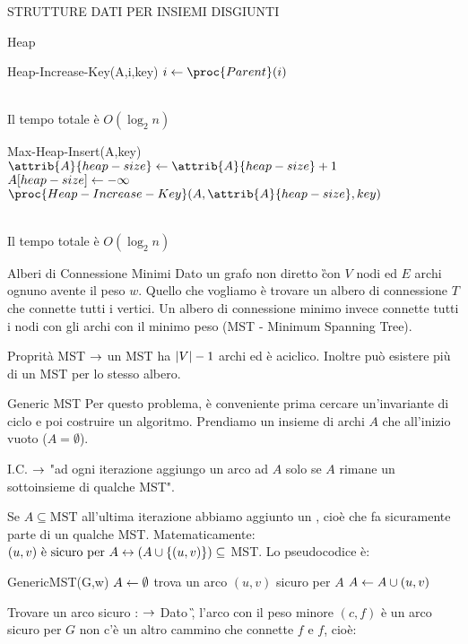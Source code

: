 \documentclass[8pt]{extarticle}
\begin{document}
\begin{formulario}
\begin{myParagraph}{STRUTTURE DATI PER INSIEMI DISGIUNTI}
\begin{subParagraph}{Heap}
\begin{code}{Heap-Increase-Key(A,i,key)}
	\li $i\get \proc{Parent}(i)$
\END
				\end{code}
\\
Il tempo totale è $O(\log_2 n)$\\
				\begin{code}{Max-Heap-Insert(A,key)}
\li $\attrib{A}{heap-size}\get \attrib{A}{heap-size}+1$
\li $A[heap-size]\leftarrow -\infty$
\li $\proc{Heap-Increase-Key}(A,\attrib{A}{heap-size},key)$
				\end{code}
\\
Il tempo totale è $O(\log_2 n)$\\
			\end{subParagraph}
	\end{myParagraph}
	
	\begin{myParagraphEnd}{Alberi di Connessione Minimi}
Dato un grafo non diretto \G con $V$ nodi ed $E$ archi ognuno avente il peso $w$. Quello che vogliamo è trovare un albero di connessione $T$ che connette tutti i vertici. Un albero di connessione minimo invece connette tutti i nodi con gli archi con il minimo peso (MST - Minimum Spanning Tree).
		\begin{Descr} 
			\item[Proprità MST] $\rightarrow$ un MST ha $\left\vert V \right\vert-1$ archi ed è aciclico. Inoltre può esistere più di un MST per lo stesso albero.
		\end{Descr}
		\begin{subParagraph}{Generic MST}
Per questo problema, è conveniente prima cercare un'invariante di ciclo e poi costruire un algoritmo. Prendiamo un insieme di archi $A$ che all'inizio vuoto ($A=\emptyset$). 
			\begin{Descr} 
				\item[I.C.] $\rightarrow$ "ad ogni iterazione aggiungo un arco ad $A$ solo se $A$ rimane un sottoinsieme di qualche MST".
			\end{Descr}
Se $A\subseteq \text{MST}$ all'ultima iterazione abbiamo aggiunto un , cioè che fa sicuramente parte di un qualche MST. Matematicamente: $(u,v) \text{ è sicuro per } A \leftrightarrow (A\cup \{(u,v)\})\subseteq$ MST. Lo pseudocodice è:
			\begin{code}{GenericMST(G,w)}
\li $A\leftarrow\emptyset$
\li {}
	\li trova un arco $(u,v)$ sicuro per $A$
	\li $A \leftarrow A\cup(u,v)$
\END
			\end{code}
			\begin{Descr} 
				\item[Trovare un arco sicuro]: $\rightarrow$ Dato \G, l'arco con il peso minore $(c,f)$ è un arco sicuro per $G$ \SSE non c'è un altro cammino che connette $f$ e $f$, cioè:\\

\end{Descr}
\end{subParagraph}
\end{myParagraphEnd}
\end{formulario}
\end{document}
